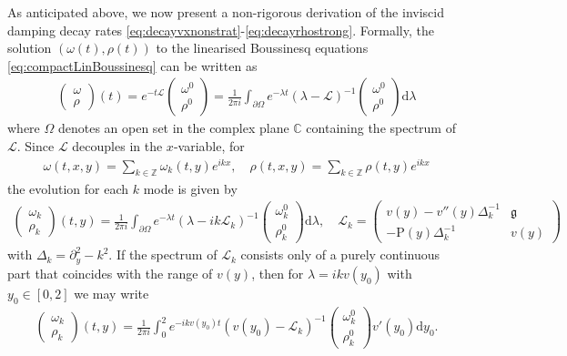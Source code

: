 \documentclass[11pt,reqno]{amsproc}
\theoremstyle{definition}
\numberwithin{equation}{section}
\newcommand{\C}{{\mathbb C}}
\renewcommand{\L}{{\mathcal{L}}}
\newcommand{\Z}{{\mathbb Z}}
\renewcommand{\d}{\mathrm{d}}
\newcommand{\g}{{\mathfrak{g}}}
\begin{document}
As anticipated above, we now present a non-rigorous derivation of the inviscid damping decay rates \eqref{eq:decayvxnonstrat}-\eqref{eq:decayrhostrong}. Formally, the solution $(\omega(t), \rho(t))$ to the linearised Boussinesq equations \eqref{eq:compactLinBoussinesq} can be written as
\begin{align*}
\begin{pmatrix}
\omega \\ \rho
\end{pmatrix}(t) = e^{-t\L}\begin{pmatrix}
\omega^0 \\ \rho^0
\end{pmatrix} = \frac{1}{2\pi i}\int_{\partial\Omega}e^{-\lambda t}(\lambda-\L)^{-1}\begin{pmatrix}
\omega^0 \\ \rho^0
\end{pmatrix} \d \lambda
\end{align*}
where $\Omega$ denotes an open set in the complex plane $\C$ containing the spectrum of $\L$. Since $\L$ decouples in the $x$-variable, for 
\begin{align*}
\omega(t,x,y) = \sum_{k\in \Z}\omega_k(t,y)e^{ikx}, \quad \rho(t,x,y) = \sum_{k\in \Z}\rho(t,y)e^{ikx}
\end{align*}
the evolution for each $k$ mode is given by
\begin{align*}
\begin{pmatrix}
\omega_k \\ \rho_k
\end{pmatrix}(t,y) = \frac{1}{2\pi i}\int_{\partial\Omega} e^{-\lambda t} (\lambda - ik \L_k)^{-1} \begin{pmatrix}
\omega_k^0 \\ \rho_k^0 
\end{pmatrix} \d \lambda, \quad \L_k = \begin{pmatrix}
v(y) - v''(y)\Delta_k^{-1} & \g \\
-\mathrm{P}(y)\Delta_k^{-1} & v(y)
\end{pmatrix}
\end{align*}
with $\Delta_k = \partial_y^2 - k^2$. If the spectrum of $\L_k$ consists only of a purely continuous part that coincides with the range of $v(y)$, then for $\lambda = ik v(y_0)$ with $y_0\in [0,2]$ we may write
\begin{align*}
\begin{pmatrix}
\omega_k \\ \rho_k
\end{pmatrix}(t,y) = \frac{1}{2\pi i}\int_0^2 e^{- ikv(y_0) t} (v(y_0) -\L_k)^{-1} \begin{pmatrix}
\omega_k^0 \\ \rho_k^0 
\end{pmatrix} v'(y_0) \d y_0.
\end{align*}
\end{document}
